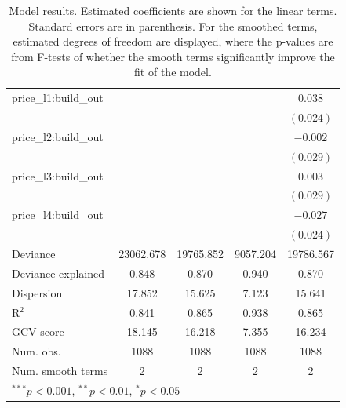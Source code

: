 \documentclass[12pt]{article}
\begin{document}
\begin{table}
\begin{center}
\begin{tabular}{l c c c c }
price\_l1:build\_out                   &                &                &                  & $0.038$        \\
                                             &                &                &                  & $(0.024)$      \\
price\_l2:build\_out                   &                &                &                  & $-0.002$       \\
                                             &                &                &                  & $(0.029)$      \\
price\_l3:build\_out                   &                &                &                  & $0.003$        \\
                                             &                &                &                  & $(0.029)$      \\
price\_l4:build\_out                   &                &                &                  & $-0.027$       \\
                                             &                &                &                  & $(0.024)$      \\
\hline
Deviance                                     & 23062.678      & 19765.852      & 9057.204         & 19786.567      \\
Deviance explained                           & 0.848          & 0.870          & 0.940            & 0.870          \\
Dispersion                                   & 17.852         & 15.625         & 7.123            & 15.641         \\
R$^2$                                        & 0.841          & 0.865          & 0.938            & 0.865          \\
GCV score                                    & 18.145         & 16.218         & 7.355            & 16.234         \\
Num. obs.                                    & 1088           & 1088           & 1088             & 1088           \\
Num. smooth terms                            & 2              & 2              & 2                & 2              \\
\hline
\multicolumn{5}{l}{\scriptsize{$^{***}p<0.001$, $^{**}p<0.01$, $^*p<0.05$}}
\end{tabular}
\caption{Model results. Estimated coefficients are shown for the linear terms. Standard errors are in parenthesis. For the smoothed terms, estimated degrees of freedom are displayed, where the p-values are from F-tests of whether the smooth terms significantly improve the fit of the model.}
\label{GAM_model_table}
\end{center}
\end{table}
\end{document}
